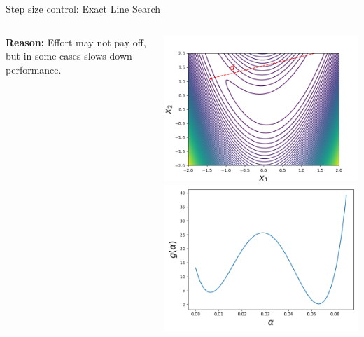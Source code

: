 \documentclass[11pt,compress,t,notes=noshow, xcolor=table]{beamer}
\begin{document}
\begin{vbframe}{Step size control: Exact Line Search}
\begin{columns}
\begin{column}{0.59\textwidth}
                \textbf{Reason:} Effort may not pay off, but in some cases slows down performance.
			\end{column}
			\begin{column}{0.4\textwidth}
				\vspace*{-1cm}
				\begin{center}
					\includegraphics[width = \textwidth]{figure_man/line_search_rosenbrock.png} \\
					\includegraphics[width = \textwidth]{figure_man/line_search_rosenbrock_alpha.png}
				\end{center}
			\end{column}
		\end{columns}
	\end{vbframe}
	
\end{document}
